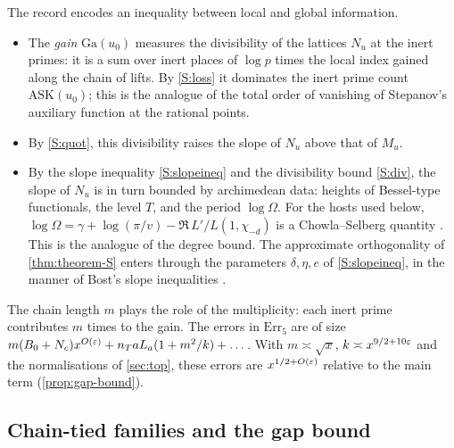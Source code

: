 \begin{remark}\label{rem:stepanov:mechanism}
The record encodes an inequality between local and global information.
\begin{itemize}
\item The \emph{gain} $\mathrm{Ga}(u_0)$ measures the divisibility of the lattices $N_u$ at the inert
primes: it is a sum over inert places of $\log p$ times the local index gained along the chain of
lifts. By \ref{S:loss} it dominates the inert prime count $\mathrm{ASK}(u_0)$; this is the analogue of
the total order of vanishing of Stepanov's auxiliary function at the rational points.
\item By \ref{S:quot}, this divisibility raises the slope of $N_u$ above that of $M_u$.
\item By the slope inequality \ref{S:slopeineq} and the divisibility bound \ref{S:div}, the slope of $N_u$
is in turn bounded by archimedean data: heights of Bessel-type functionals, the level $T$, and the period
$\log\Omega$. For the hosts used below, $\log\Omega=\gamma+\log(\pi/v)-\Re\,L'/L(1,\chi_{-d})$ is a
Chowla--Selberg quantity \cite{ChowlaSelberg1967}. This is the analogue of the degree bound. The
approximate orthogonality of \cref{thm:theorem-S} enters through the parameters $\delta,\eta,e$ of
\ref{S:slopeineq}, in the manner of Bost's slope inequalities \cite{Bost1996,Bost2001}.
\end{itemize}
The chain length $m$ plays the role of the multiplicity: each inert prime contributes $m$ times to the
gain. The errors in $\mathrm{Err}_5$ are of size $m(B_0+N_c)x^{O(\varepsilon)}+n_Ta L_a(1+m^2/k)+\dots$.
With $m\asymp\sqrt x$, $k\asymp x^{9/2+10\varepsilon}$ and the normalisations of \cref{sec:top}, these errors
are $x^{1/2+O(\varepsilon)}$ relative to the main term (\cref{prop:gap-bound}).
\end{remark}

\subsection{Chain-tied families and the gap bound}

